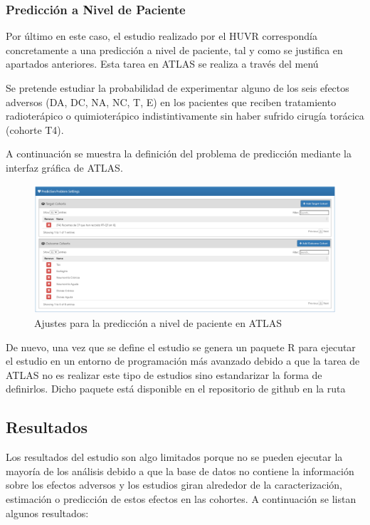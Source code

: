 \subsubsection{Predicción a Nivel de Paciente}

Por último en este caso, el estudio realizado por el HUVR correspondía concretamente a una predicción a nivel de paciente, tal y como se justifica en apartados anteriores. Esta tarea en ATLAS se realiza a través del menú 

Se pretende estudiar la probabilidad de experimentar alguno de los seis efectos adversos (DA, DC, NA, NC, T, E) en los pacientes que reciben tratamiento radioterápico o quimioterápico indistintivamente sin haber sufrido cirugía torácica (cohorte T4).

A continuación se muestra la definición del problema de predicción mediante la interfaz gráfica de ATLAS.

\begin{figure}[H]
    \centering
    \includegraphics[width=1\textwidth]{figures/predictionPLP.png}
    \caption{Ajustes para la predicción a nivel de paciente en ATLAS}
    \label{figure:predictionPLP}
\end{figure}

De nuevo, una vez que se define el estudio se genera un paquete R para ejecutar el estudio en un entorno de programación más avanzado debido a que la tarea de ATLAS no es realizar este tipo de estudios sino estandarizar la forma de definirlos. Dicho paquete está disponible en el repositorio de github en la ruta 

\subsection{Resultados}

Los resultados del estudio son algo limitados porque no se pueden ejecutar la mayoría de los análisis debido a que la base de datos no contiene la información sobre los efectos adversos y los estudios giran alrededor de la caracterización, estimación o predicción de estos efectos en las cohortes. A continuación se listan algunos resultados:

